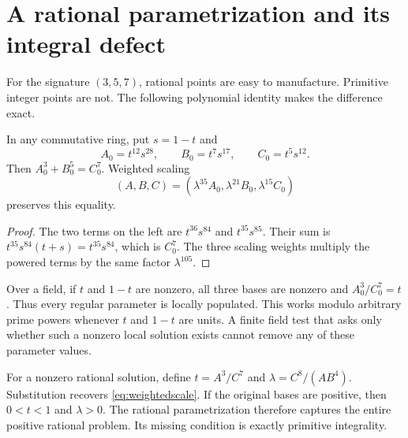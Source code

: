 \section{A rational parametrization and its integral defect}\label{sec:scaling}
For the signature $(3,5,7)$, rational points are easy to manufacture. Primitive integer points are not. The following polynomial identity makes the difference exact.
\begin{proposition}\label{prop:universal}
In any commutative ring, put $s=1-t$ and
\[
A_0=t^{12}s^{28},\qquad B_0=t^7s^{17},\qquad C_0=t^5s^{12}.
\]
Then $A_0^3+B_0^5=C_0^7$. Weighted scaling
\begin{equation}\label{eq:weightedscale}
(A,B,C)=(\lambda^{35}A_0,\lambda^{21}B_0,\lambda^{15}C_0)
\end{equation}
preserves this equality.
\end{proposition}
\begin{proof}
The two terms on the left are $t^{36}s^{84}$ and $t^{35}s^{85}$. Their sum is $t^{35}s^{84}(t+s)=t^{35}s^{84}$, which is $C_0^7$. The three scaling weights multiply the powered terms by the same factor $\lambda^{105}$.
\end{proof}
Over a field, if $t$ and $1-t$ are nonzero, all three bases are nonzero and $A_0^3/C_0^7=t$. Thus every regular parameter is locally populated. This works modulo arbitrary prime powers whenever $t$ and $1-t$ are units. A finite field test that asks only whether such a nonzero local solution exists cannot remove any of these parameter values.

For a nonzero rational solution, define $t=A^3/C^7$ and $\lambda=C^8/(AB^4)$. Substitution recovers \eqref{eq:weightedscale}. If the original bases are positive, then $0<t<1$ and $\lambda>0$. The rational parametrization therefore captures the entire positive rational problem. Its missing condition is exactly primitive integrality.

